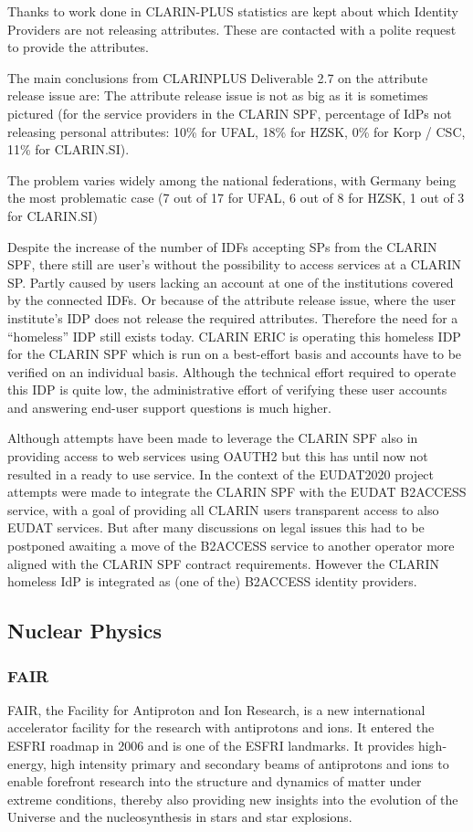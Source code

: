\documentclass[fleqn,10pt]{wlscirep}
\begin{document}
{Thanks to work done in CLARIN-PLUS\cite{Mistuka} statistics are kept about which Identity Providers are not releasing attributes. These are contacted with a polite request to provide the attributes.

The main conclusions from CLARINPLUS Deliverable 2.7 on the attribute release issue are:
The attribute release issue is not as big as it is sometimes pictured (for the service providers in the CLARIN SPF, percentage of IdPs not releasing personal attributes: 10\% for UFAL, 18\% for HZSK, 0\% for Korp / CSC, 11\% for CLARIN.SI).

The problem varies widely among the national federations, with Germany being the most problematic case (7 out of 17 for UFAL, 6 out of 8 for HZSK, 1 out of 3 for CLARIN.SI)

Despite the increase of the number of IDFs accepting SPs from  the CLARIN SPF, there still are user's without the possibility to access services at a CLARIN SP.  Partly caused by users lacking an account at one of the institutions covered by the connected IDFs. Or because of the attribute release issue, where the user institute’s  IDP does not release the required attributes. Therefore the need for a “homeless” IDP still exists today. CLARIN ERIC is operating this homeless IDP for the CLARIN SPF which  is run on a best-effort basis and accounts have to be verified on an individual basis. Although the technical effort required to operate this IDP is quite low, the administrative effort of verifying these user accounts and answering end-user support questions is much higher.

Although attempts have been made to leverage the CLARIN SPF also in providing access to web services using OAUTH2 but this has until now not resulted in a ready to use service. In the context of the EUDAT2020 project attempts were made to integrate the CLARIN SPF with the EUDAT B2ACCESS service, with a goal of providing all CLARIN users transparent access to also EUDAT services. But after many discussions on legal issues this had to be postponed awaiting a move of the B2ACCESS service to another operator more aligned with the CLARIN SPF contract requirements. However the CLARIN homeless IdP is integrated as (one of the) B2ACCESS identity providers.

\subsection{Nuclear Physics}
\subsubsection{FAIR}
FAIR, the Facility for Antiproton and Ion Research, is a new international accelerator facility for the research with antiprotons and ions. It entered the ESFRI roadmap in 2006 and is one of the ESFRI landmarks. It provides high-energy, high intensity primary and secondary beams of antiprotons and ions to enable forefront research into the structure and dynamics of matter under extreme conditions, thereby also providing new insights into the evolution of the Universe and the nucleosynthesis in stars and star explosions.
 
}
\end{document}
